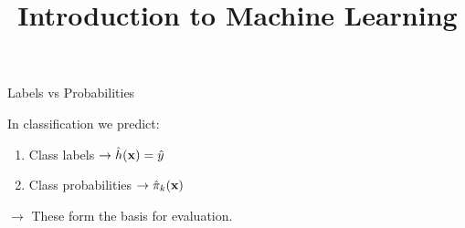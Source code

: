 \documentclass[11pt,compress,t,notes=noshow, xcolor=table]{beamer}
\title{Introduction to Machine Learning}
\institute{\href{https://compstat-lmu.github.io/lecture_i2ml/}{compstat-lmu.github.io/lecture\_i2ml}}
\date{}
\begin{document}







\begin{vbframe}{Labels vs Probabilities}

\lz
In classification we predict:

\lz
\begin{enumerate}
\item Class labels $\rightarrow \hat{h}(\mathbf{x}) = \hat{y}$
\item Class probabilities $\rightarrow \hat \pi_{k}(\mathbf{x})$
\end{enumerate}

\lz
$\rightarrow$ These form the basis for evaluation.


\end{vbframe}

\end{document}
